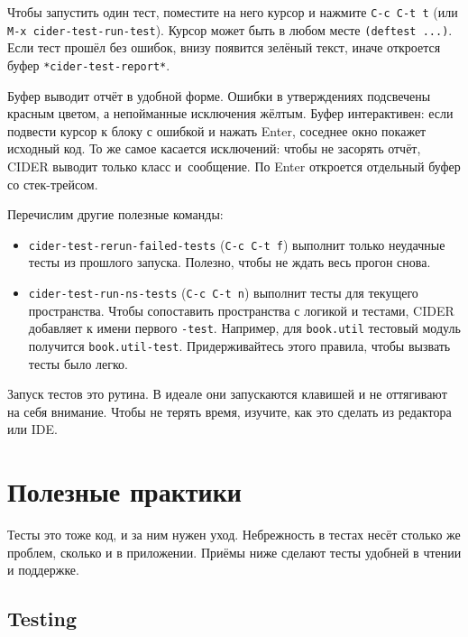 Чтобы запустить один тест, поместите на него курсор и нажмите \verb|C-c C-t t|
(или \verb|M-x cider-test-run-test|). Курсор может быть в любом месте
\verb|(deftest ...)|. Если тест прошёл без ошибок, внизу появится зелёный
текст, иначе откроется буфер \verb|*cider-test-report*|.

Буфер выводит отчёт в удобной форме. Ошибки в утверждениях подсвечены красным
цветом, а непойманные исключения жёлтым. Буфер интерактивен: если подвести
курсор к блоку с ошибкой и нажать Enter, соседнее окно покажет исходный код. То
же самое касается исключений: чтобы не засорять отчёт, CIDER выводит только
класс и~сообщение. По Enter откроется отдельный буфер со стек-трейсом.

Перечислим другие полезные команды:

\begin{itemize}

\item
  \verb|cider-test-rerun-failed-tests| (\verb|C-c C-t f|) выполнит только
  неудачные тесты из прошлого запуска. Полезно, чтобы не ждать весь прогон
  снова.

\item
  \verb|cider-test-run-ns-tests| (\verb|C-c C-t n|) выполнит тесты для текущего
  пространства. Чтобы сопоставить пространства с логикой и тестами, CIDER
  добавляет к имени первого \verb|-test|. Например, для \verb|book.util|
  тестовый модуль получится \verb|book.util-test|. Придерживайтесь этого
  правила, чтобы вызвать тесты было легко.

\end{itemize}

Запуск тестов это рутина. В идеале они запускаются клавишей и не оттягивают на
себя внимание. Чтобы не терять время, изучите, как это сделать из редактора или
IDE.

\section{Полезные практики}

Тесты это тоже код, и за ним нужен уход. Небрежность в тестах несёт столько же
проблем, сколько и в приложении. Приёмы ниже сделают тесты удобней в чтении и
поддержке.

\subsection{Testing}


